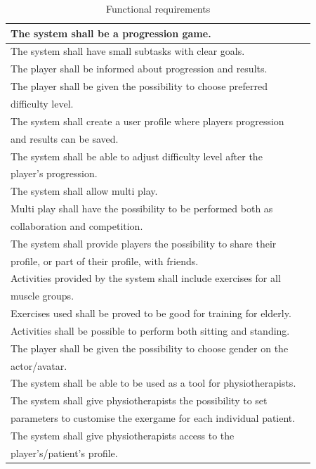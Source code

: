 \begin{table} [H]
\label{tab:func2}
\centering
    \begin{tabular}{|l|l|}
       \hline
	   The system shall be a progression game.\\ \hline
	   The system shall have small subtasks with clear goals.\\ \hline
	   The player shall be informed about progression and results.\\ \hline
	   The player shall be given the possibility to choose preferred \\ difficulty level.\\ \hline
	   The system shall create a user profile where players progression \\ and results can be saved.\\ \hline
	   The system shall be able to adjust difficulty level after the \\ player's progression.\\ \hline
	   The system shall allow multi play.\\ \hline
	   Multi play shall have the possibility to be performed both as \\ collaboration and competition.\\ \hline
	   The system shall provide players the possibility to share their \\ profile, or part of their profile, with friends. \\ \hline
	   Activities provided by the system shall include exercises for all \\ muscle groups.\\ \hline
	   Exercises used shall be proved to be good for training for elderly.\\ \hline
	   Activities shall be possible to perform both sitting and standing. \\ \hline
	   The player shall be given the possibility to choose gender on the \\ actor/avatar. \\ \hline
	   The system shall be able to be used as a tool for physiotherapists.\\ \hline
	   The system shall give physiotherapists the possibility to set \\ parameters to customise the exergame for each individual patient.\\ \hline
	   The system shall give physiotherapists access to the \\ player's/patient's profile. \\ \hline  
    \end{tabular}
    \caption[Functional requirements]{Functional requirements}
\end{table} 


